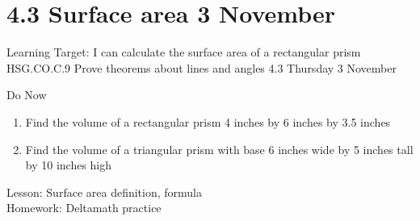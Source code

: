 \section{4.3 Surface area \hfill 3 November \,}
  \begin{frame}{Learning Target: I can calculate the surface area of a rectangular prism}
    {HSG.CO.C.9 Prove theorems about lines and angles  \hfill \alert{4.3 Thursday 3 November}}
    \begin{block}{Do Now}
      \begin{enumerate}
        \item Find the volume of a rectangular prism 4 inches by 6 inches by 3.5 inches
        \item Find the volume of a triangular prism with base 6 inches wide by 5 inches tall by 10 inches high
      \end{enumerate}
    \end{block}
      Lesson: Surface area definition, formula \\
      Homework: Deltamath  practice
  \end{frame}

